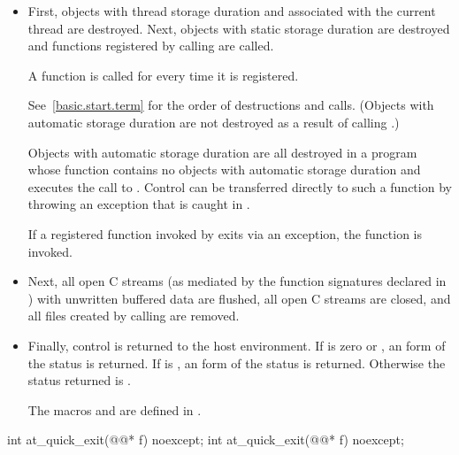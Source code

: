 \begin{itemdescr}
\pnum
\effects
\begin{itemize}
\item
First, objects with thread storage duration and associated with the current thread
are destroyed. Next, objects with static storage duration are destroyed
and functions registered by calling
are called.
\begin{footnote}
A function is called for every time it is registered.
\end{footnote}
See~\ref{basic.start.term} for the order of destructions and calls.
(Objects with automatic storage duration are not destroyed as a result of calling
.)
\begin{footnote}
Objects with automatic storage duration are all destroyed in a program whose
 function
contains no objects with automatic storage duration and executes the call to
.
Control can be transferred directly to such a
 function
by throwing an exception that is caught in
.
\end{footnote}

If a registered function invoked by  exits via an exception,
the function  is invoked.%
%

\item
Next, all open C streams (as mediated by the function
signatures declared in )
with unwritten buffered data are flushed, all open C
streams are closed, and all files created by calling
 are removed.

\item
Finally, control is returned to the host environment.
If  is zero or
,
an 
form of the status
is returned.
If  is
,
an  form of the status
is returned.
Otherwise the status returned is .
\begin{footnote}
The macros  and 
are defined in .
\end{footnote}
\end{itemize}
\end{itemdescr}

%
\begin{itemdecl}
int at_quick_exit(@@* f) noexcept;
int at_quick_exit(@@* f) noexcept;
\end{itemdecl}

